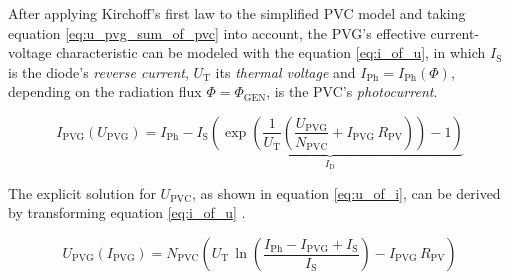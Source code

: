 After applying Kirchoff's first law to the simplified PVC model and taking equation \ref{eq:u_pvg_sum_of_pvc} into account, the PVG's effective current-voltage characteristic can be modeled with the equation \ref{eq:i_of_u}, in which $I_{\mathrm{S}}$ is the diode's \emph{reverse current}, $U_{\mathrm{T}}$ its \emph{thermal voltage} and $I_{\mathrm{Ph}} = I_{\mathrm{Ph}}\left(\Phi\right)$, depending on the radiation flux $\Phi = \Phi_{\mathrm{GEN}}$, is the PVC's \emph{photocurrent}.
\begin{center}
	\begin{equation} \label{eq:i_of_u}
		I_{\mathrm{PVG}}\left(U_{\mathrm{PVG}}\right) = I_{\mathrm{Ph}} - \underbrace{I_{\mathrm{S}} \left( \exp \left( \frac{1}{U_{\mathrm{T}}} \left( \frac{U_{\mathrm{PVG}}}{N_{\mathrm{PVC}}} + I_{\mathrm{PVG}} \, R_{\mathrm{PV}} \right) \right) - 1  \right)}_{I_{\mathrm{D}}}
	\end{equation}
\end{center}
The explicit solution for $U_{\mathrm{PVC}}$, as shown in equation \ref{eq:u_of_i}, can be derived by transforming equation \ref{eq:i_of_u} \cite{Mertens:2015, Tietze:2016, Wagner:2018}. 
\begin{center}
	\begin{equation} \label{eq:u_of_i}
		U_{\mathrm{PVG}}\left(I_{\mathrm{PVG}}\right) = N_{\mathrm{PVC}} \left( U_{\mathrm{T}} \, \ln \left( \frac{I_{\mathrm{Ph}} - I_{\mathrm{PVG}} + I_{\mathrm{S}}}{I_{\mathrm{S}}} \right) - I_{\mathrm{PVG}} \, R_{\mathrm{PV}} \right)
	\end{equation}
\end{center}

